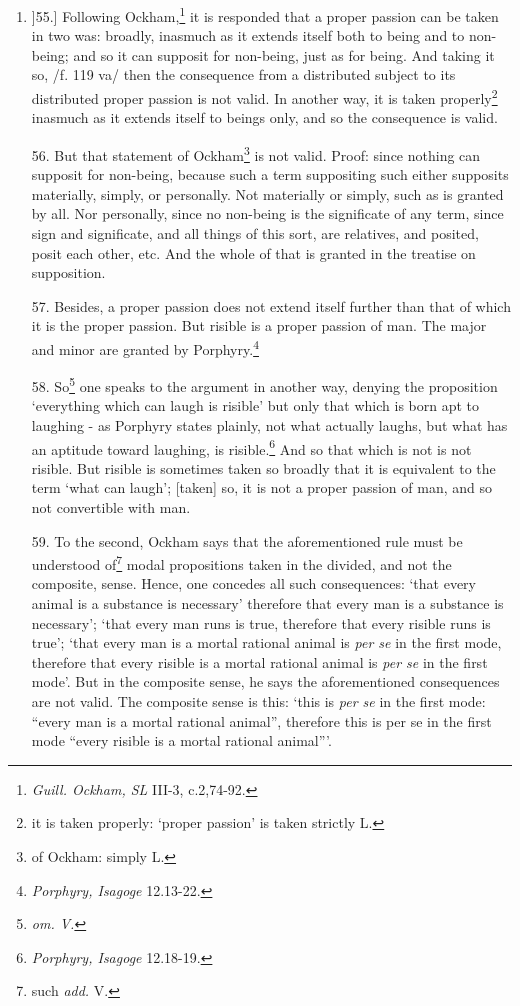 \documentclass[]{article}
\begin{document}
\begin{enumerate}
	\item]55.] Following Ockham,\footnote{\textit{Guill. Ockham, SL} III-3, c.2,74-92.} it is responded that a proper passion can be taken in two was: broadly, inasmuch as it extends itself both to being and to non-being; and so it can supposit for non-being, just as for being. And taking it so, /f. 119 va/ then the consequence from a distributed subject to its distributed proper passion  is not valid. In another way, it is taken properly\footnote{it is taken properly: `proper passion' is taken strictly L.} inasmuch as it extends itself to beings only, and so the consequence is valid. 
	\item[56.] But that statement of Ockham\footnote{of Ockham: simply L.} is not valid. Proof: since nothing can supposit for non-being, because such a term suppositing such either supposits materially, simply, or personally. Not materially or simply, such as is granted by all. Nor personally, since no non-being is the significate of any term, since sign and significate, and all things of this sort, are relatives, and posited, posit each other, etc. And the whole of that is granted in the treatise on supposition.
	\item[57.] Besides, a proper passion does not extend itself further than that of which it is the proper passion. But risible is a proper passion of man. The major and minor are granted by Porphyry.\footnote{\textit{Porphyry, Isagoge} 12.13-22.}
	\item[58.] So\footnote{\textit{om. V.}} one speaks to the argument in another way, denying the proposition `everything which can laugh is risible' but only that which is born apt to laughing - as Porphyry states plainly, not what actually laughs, but what has an aptitude toward laughing, is risible.\footnote{\textit{Porphyry, Isagoge} 12.18-19.} And so that which is not is not risible. But risible is sometimes taken so broadly that it is equivalent to the term `what can laugh'; [taken] so, it is not a proper passion of man, and so not convertible with man. 
	\item[59.] To the second, Ockham says that the aforementioned rule must be understood of\footnote{such \textit{add.} V.} modal propositions taken in the divided, and not the composite, sense. Hence, one concedes all such consequences: `that every animal is a substance is necessary' therefore that every man is a substance is necessary'; `that every man runs is true, therefore that every risible runs is true'; `that every man is a mortal rational animal is \textit{per se} in the first mode, therefore that every risible is a mortal rational animal is \textit{per se} in the first mode'. But in the composite sense, he says the aforementioned consequences are not valid. The composite sense is this: `this is \textit{per se} in the first mode: ``every man is a mortal rational animal'', therefore this is per se in the first mode ``every risible is a mortal rational animal'''. 

\end{enumerate}
\end{document}
